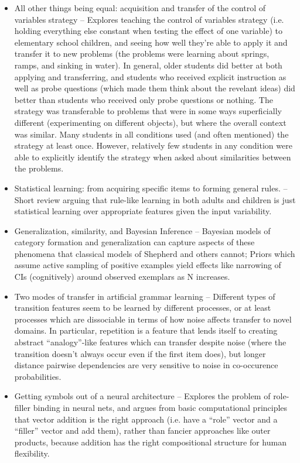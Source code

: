 \documentclass[11pt]{article}
\begin{document}
\begin{itemize}
\item All other things being equal: acquisition and transfer of the control of variables strategy -- Explores teaching the control of variables strategy (i.e. holding everything else constant when testing the effect of one variable) to elementary school children, and seeing how well they're able to apply it and transfer it to new problems (the problems were learning about springs, ramps, and sinking in water). In general, older students did better at both applying and transferring, and students who received explicit instruction as well as probe questions (which made them think about the revelant ideas) did better than students who received only probe questions or nothing. The strategy was transferable to problems that were in some ways superficially different (experimenting on different objects), but where the overall context was similar. Many students in all conditions used (and often mentioned) the strategy at least once. However, relatively few students in any condition were able to explicitly identify the strategy when asked about similarities between the problems. \citep{Chen1999}
\item Statistical learning:  from acquiring specific items to forming general rules. -- Short review arguing that rule-like learning in both adults and children is just statistical learning over appropriate features given the input variability. 
\item Generalization, similarity, and Bayesian Inference -- Bayesian models of category formation and generalization can capture aspects of these phenomena that classical models of Shepherd and others cannot; Priors which assume active sampling of positive examples yield effects like narrowing of CIs (cognitively) around observed exemplars as N increases. \citep{Tenenbaum2001}
\item Two modes of transfer in artificial grammar learning -- Different types of transition features seem to be learned by different processes, or at least processes which are dissociable in terms of how noise affects transfer to novel domains. In particular, repetition is a feature that lends itself to creating abstract ``analogy''-like features which can transfer despite noise (where the transition doesn't always occur even if the first item does), but longer distance pairwise dependencies are very sensitive to noise in co-occurence probabilities. \citep{Tunney2001}
\item Getting symbols out of a neural architecture -- Explores the problem of role-filler binding in neural nets, and argues from basic computational principles that vector addition is the right approach (i.e. have a ``role'' vector and a ``filler'' vector and add them), rather than fancier approaches like outer products, because addition has the right compositional structure for human flexibility. \citet{HummelSomeYear}

\end{itemize}
\end{document}
